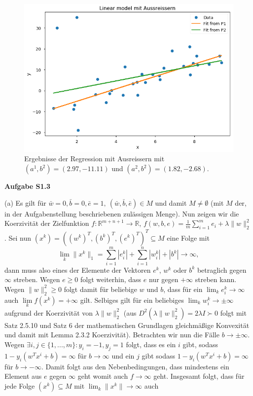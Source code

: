 \documentclass[ngerman, a4paper,12pt]{article}
\begin{document}
\begin{figure}[h]
	\centering
	\includegraphics[width=0.8\columnwidth]{21d.png}
	\caption{\label{fig:21d} Ergebnisse der Regression mit Ausreissern mit $(a^1, b^2) = (2.97, -11.11)$ und $(a^2, b^2) = (1.82, -2.68)$.}
\end{figure}
\textbf{Aufgabe S1.3} \par
(a) Es gilt für $\bar{w}=0, \bar{b}=0, \bar{e}=1, \ (\bar{w}, \bar{b}, \bar{e}) \in M$ und damit $M\neq \emptyset$ (mit $M$ der, in der Aufgabenstellung beschriebenen zulässigen Menge). Nun zeigen wir die Koerzivität der Zielfunktion $f: \mathbb{R}^{m+n+1} \rightarrow \mathbb{R}$, $f(w,b,e) = \frac{1}{m} \sum_{i=1}^{m}e_i + \lambda \|w \|_2^2$. Sei nun $(x^k) = ( (w^k)^T, (b^k)^T, (e^k)^T)^T \subseteq M$ eine Folge mit 
\begin{equation}
	\lim\limits_{k} \| x^k \|_1 = \sum_{i=1}^{m}|e_i^k| + \sum_{i=1}^{n} |w_i^k| + |b^k|  \rightarrow \infty,
\end{equation}
dann muss also eines der Elemente der Vektoren $e^k$, $w^k$ oder $b^k$ betraglich gegen $\infty$ streben. Wegen $e \geq 0$ folgt weiterhin, dass $e$ nur gegen $+ \infty$ streben kann. Wegen $\| w \|_2^2 \geq 0$ folgt damit für beliebige $w$ und $b$, dass für ein $\lim_k e_i^k \rightarrow \infty$ auch $\lim\limits_{k} f(x^k) = + \infty$ gilt. Selbiges gilt für ein beliebiges $\lim_k w_i^k \rightarrow \pm \infty$ aufgrund der Koerzivität von $\lambda \|w \|_2^2$ (aus $D^2(\lambda \|w\|_2^2)=2\lambda I \succ 0$ folgt mit Satz 2.5.10 und Satz 6 der mathematischen Grundlagen gleichmäßige Konvexität und damit mit Lemma 2.3.2 Koerzivität). Betrachten wir nun die Fälle $b \rightarrow \pm \infty$. Wegen $\exists i,j \in \{1,...,m \} : y_i = -1, y_j = 1$ folgt, dass es ein $i$ gibt, sodass $1 - y_i (w^Tx^i + b) = \infty$ für $b \rightarrow \infty$ und ein $j$ gibt sodass $1 - y_i (w^Tx^i + b) = \infty$ für $b \rightarrow -\infty$. Damit folgt aus den Nebenbedingungen, dass mindestens ein Element aus $e$ gegen $\infty$ geht womit auch $f \rightarrow \infty$ geht. Insgesamt folgt, dass für jede Folge $(x^k) \subseteq M$ mit $\lim_k \| x^k \| \rightarrow \infty$ auch
\end{document}
